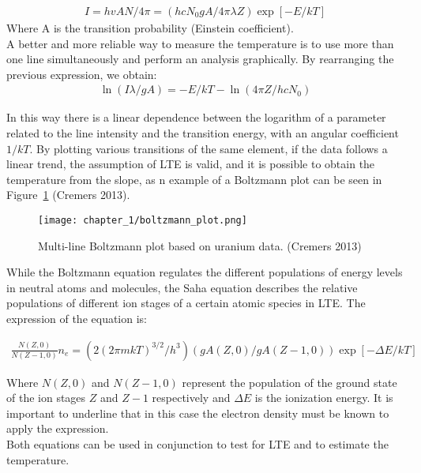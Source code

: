 \begin{align}
   I=hvAN/4\pi=\left(hcN_0gA/4\pi\lambda Z\right)\exp{\left[-E/kT\right]} \label{eq:spectral_radial_int}  
\end{align}
Where A is the transition probability (Einstein coefficient).
\\
A better and more reliable way to measure the temperature is to use more than one line simultaneously and perform an analysis graphically. By rearranging the previous expression, we obtain:
\begin{align}
   \ln{\left(I\lambda/gA\right)}=-E/kT-\ln{\left(4\pi Z/hcN_0\right)} \label{eq:bolzmann_plot_eq}  
\end{align}

In this way there is a linear dependence between the logarithm of a parameter related to the line intensity and the transition energy, with an angular coefficient $1/kT$. By plotting various transitions of the same element, if the data follows a linear trend, the assumption of LTE is valid, and it is possible to obtain the temperature from the slope, as n example of a Boltzmann plot can be seen in Figure~\ref{fig:boltzmann_plot_example} (Cremers 2013).

\begin{figure}[H]
    \centering
    \texttt{[image: chapter\_1/boltzmann\_plot.png]}
    \caption{Multi-line Boltzmann plot based on uranium data. (Cremers 2013)}
    \label{fig:boltzmann_plot_example}
\end{figure}
While the Boltzmann equation regulates the different populations of energy levels in neutral atoms and molecules, the Saha equation describes the relative populations of different ion stages of a certain atomic species in LTE. The expression of the equation \cite{bekefiPrinciplesLaserPlasmas1976} is:

\begin{align}
   \frac{N\left(Z,0\right)}{N\left(Z-1,0\right)}n_{e}=\left(2\left(2\pi m k T\right)^{3/2}/h^3\right)\left(gA\left(Z,0\right)/gA\left(Z-1,0\right)\right)\exp{\left[-\Delta E/kT\right]} \label{eq:saha_equation}  
\end{align}

Where $N(Z,0)$ and $N(Z-1,0)$ represent the population of the ground state of the ion stages $Z$ and $Z-1$ respectively and $\Delta E$ is the ionization energy. It is important to underline that in this case the electron density must be known to apply the expression.
\\
Both equations can be used in conjunction to test for LTE and to estimate the temperature.

